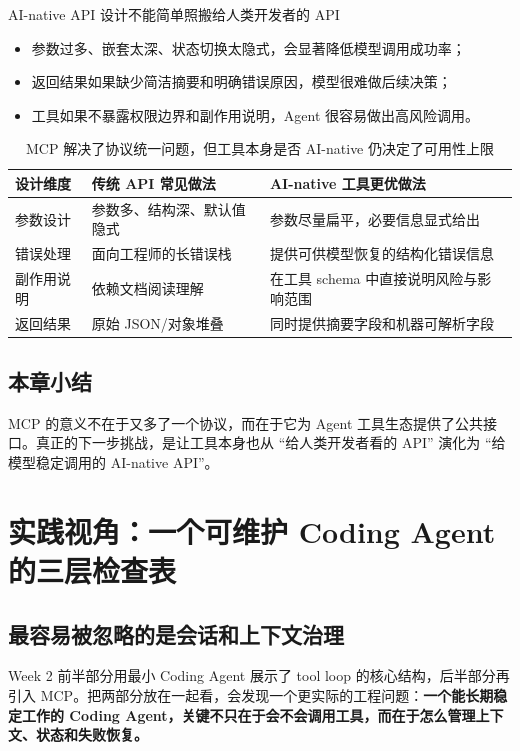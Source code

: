 \documentclass[a4paper]{article}
\begin{document}
\begin{warningbox}{AI-native API 设计不能简单照搬给人类开发者的 API}
\begin{itemize}
    \item 参数过多、嵌套太深、状态切换太隐式，会显著降低模型调用成功率；
    \item 返回结果如果缺少简洁摘要和明确错误原因，模型很难做后续决策；
    \item 工具如果不暴露权限边界和副作用说明，Agent 很容易做出高风险调用。
\end{itemize}
\end{warningbox}

\begin{table}[H]
\centering
\begin{tabular}{p{3.0cm}p{4.2cm}p{4.0cm}}
\toprule
\textbf{设计维度} & \textbf{传统 API 常见做法} & \textbf{AI-native 工具更优做法} \\
\midrule
参数设计 & 参数多、结构深、默认值隐式 & 参数尽量扁平，必要信息显式给出 \\
错误处理 & 面向工程师的长错误栈 & 提供可供模型恢复的结构化错误信息 \\
副作用说明 & 依赖文档阅读理解 & 在工具 schema 中直接说明风险与影响范围 \\
返回结果 & 原始 JSON/对象堆叠 & 同时提供摘要字段和机器可解析字段 \\
\bottomrule
\end{tabular}
\caption{MCP 解决了协议统一问题，但工具本身是否 AI-native 仍决定了可用性上限}
\end{table}

\subsection{本章小结}
MCP 的意义不在于又多了一个协议，而在于它为 Agent 工具生态提供了公共接口。真正的下一步挑战，是让工具本身也从 ``给人类开发者看的 API'' 演化为 ``给模型稳定调用的 AI-native API''。

\section{实践视角：一个可维护 Coding Agent 的三层检查表}

\subsection{最容易被忽略的是会话和上下文治理}
Week 2 前半部分用最小 Coding Agent 展示了 tool loop 的核心结构，后半部分再引入 MCP。把两部分放在一起看，会发现一个更实际的工程问题：\textbf{一个能长期稳定工作的 Coding Agent，关键不只在于会不会调用工具，而在于怎么管理上下文、状态和失败恢复。}
\end{document}
